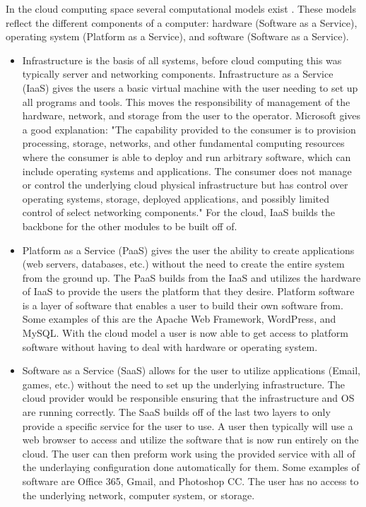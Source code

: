 \documentclass[12pt]{article}
\begin{document}
In the cloud computing space several computational models exist \cite{neto2011demystifying}. These models reflect the different components of a computer: hardware (Software as a Service), operating system (Platform as a Service), and software (Software as a Service).

\begin{itemize}
    \item Infrastructure is the basis of all systems, before cloud computing this was typically server and networking components. Infrastructure as a Service (IaaS) gives the users a basic virtual machine with the user needing to set up all programs and tools. This moves the responsibility of management of the hardware, network, and storage from the user to the operator.  Microsoft gives a good explanation: "The capability provided to the consumer is to provision processing, storage, networks, and other fundamental computing resources where the consumer is able to deploy and run arbitrary software, which can include operating systems and applications. The consumer does not manage or control the underlying cloud physical infrastructure but has control over operating systems, storage, deployed applications, and possibly limited control of select networking components." \cite{TechWikiMic} For the cloud, IaaS builds the backbone for the other modules to be built off of.

    \item Platform as a Service (PaaS) gives the user the ability to create applications (web servers, databases, etc.) without the need to create the entire system from the ground up. The PaaS builds from the IaaS and utilizes the hardware of IaaS to provide the users the platform that they desire. Platform software is a layer of software that enables a user to build their own software from. Some examples of this are the Apache Web Framework\cite{apache}, WordPress\cite{wordpress}, and MySQL\cite{mySql}. With the cloud model a user is now able to get access to platform software without having to deal with hardware or operating system.

    \item Software as a Service (SaaS) allows for the user to utilize applications (Email, games, etc.) without the need to set up the underlying infrastructure. The cloud provider would be responsible ensuring that the infrastructure and OS are running correctly. The SaaS builds off of the last two layers to only provide a specific service for the user to use. A user then typically will use a web browser to access and utilize the software that is now run entirely on the cloud. The user can then preform work using the provided service with all of the underlaying configuration done automatically for them. Some examples of software are Office 365\cite{office}, Gmail\cite{gmail}, and Photoshop CC\cite{photoshop}. The user has no access to the underlying network, computer system, or storage.

\end{itemize}
\end{document}
